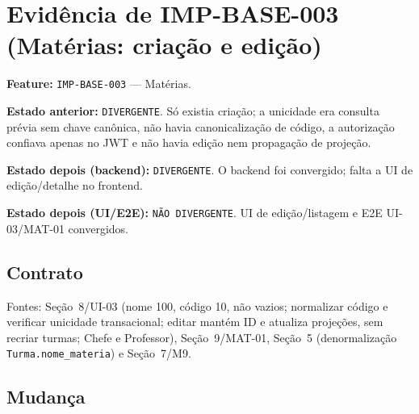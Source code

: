 \section{Evidência de IMP-BASE-003 (Matérias: criação e edição)}

\textbf{Feature:} \texttt{IMP-BASE-003} --- Matérias.

\textbf{Estado anterior:} \texttt{DIVERGENTE}. Só existia criação; a unicidade era
consulta prévia sem chave canônica, não havia canonicalização de código, a
autorização confiava apenas no JWT e não havia edição nem propagação de projeção.

\textbf{Estado depois (backend):} \texttt{DIVERGENTE}. O backend foi convergido; falta a UI
de edição/detalhe no frontend.

\textbf{Estado depois (UI/E2E):} \texttt{NÃO DIVERGENTE}. UI de edição/listagem e
E2E UI-03/MAT-01 convergidos.

\subsection{Contrato}

Fontes: Seção~8/UI-03 (nome 100, código 10, não vazios; normalizar código e
verificar unicidade transacional; editar mantém ID e atualiza projeções, sem
recriar turmas; Chefe e Professor), Seção~9/MAT-01, Seção~5 (denormalização
\texttt{Turma.nome\_materia}) e Seção~7/M9.

\subsection{Mudança}

